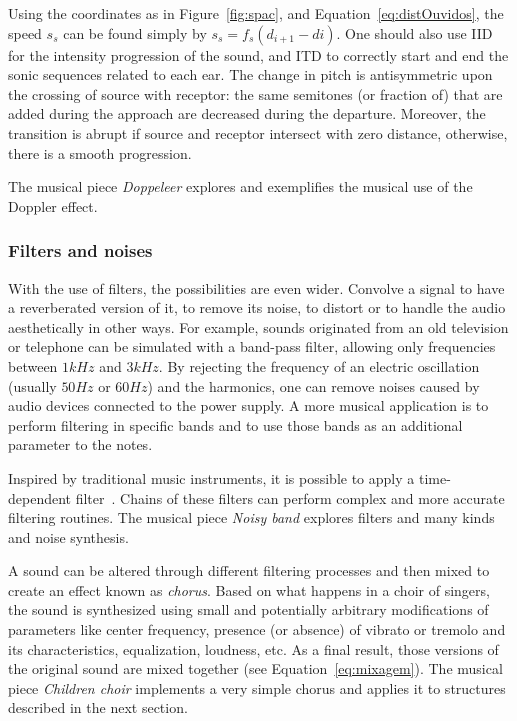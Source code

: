 Using the coordinates as in Figure~\ref{fig:spac},
and Equation~\ref{eq:distOuvidos},
the speed $s_s$ can be found simply by $s_s = f_s(d_{i+1}-d{i})$.
One should also use IID for the intensity progression of the sound,
and ITD to correctly start and end the sonic
sequences related to each ear.
The change in pitch is antisymmetric
upon the crossing of source with receptor:
the same semitones (or fraction of) that are added during the approach are decreased during the departure.
Moreover, the transition is abrupt if source and receptor intersect with zero distance, otherwise, there is a smooth progression.

The musical piece \emph{Doppeleer} explores and exemplifies the musical use of the Doppler effect.~\cite{MASSA}

\subsubsection{Filters and noises}
With the use of filters, the possibilities are even wider.
Convolve a signal to have a reverberated version of it, to remove its noise, to distort or to handle
the audio aesthetically in other ways. For example, sounds originated from an old television or telephone can be simulated with a band-pass filter, allowing only frequencies between $1kHz$ and $3kHz$. By rejecting the frequency of an electric oscillation (usually $50Hz$ or $60Hz$) and the harmonics, one can remove noises caused by audio devices connected to the power supply. A more musical application is to perform filtering in specific bands and to use those bands as an additional parameter to the notes.

Inspired by traditional music instruments, it is possible to apply a
time-dependent filter~\cite{Roederer}. Chains of these filters can perform complex and more accurate filtering routines. The musical piece \emph{Noisy band} explores filters and many kinds and noise synthesis.~\cite{MASSA}

A sound can be altered through different filtering processes and then mixed to create an effect known as \emph{chorus}. Based on what happens in a choir of singers, the sound is synthesized using small and potentially arbitrary modifications of parameters like center frequency, presence (or absence) of vibrato or tremolo and its characteristics, equalization, loudness, etc. As a final result, those versions of the original sound are mixed together (see Equation~\ref{eq:mixagem}).
The musical piece \emph{Children choir} implements a very simple chorus
and applies it to structures described in the next section.~\cite{MASSA}

